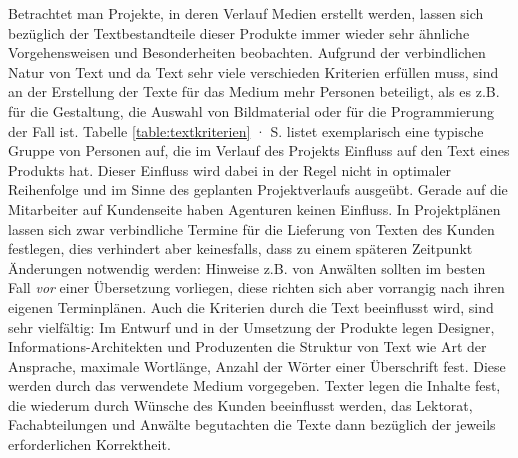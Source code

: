 Betrachtet man Projekte, in deren Verlauf Medien erstellt werden, lassen sich bezüglich der Textbestandteile dieser Produkte immer wieder sehr ähnliche Vorgehensweisen und Besonderheiten beobachten. Aufgrund der verbindlichen Natur von Text und da Text sehr viele verschieden Kriterien erfüllen muss, sind an der Erstellung der Texte für das Medium mehr Personen beteiligt, als es z.B. für die Gestaltung, die Auswahl von Bildmaterial oder für die Programmierung der Fall ist. Tabelle \ref{table:textkriterien} · S.\pageref{table:textkriterien} listet exemplarisch eine typische Gruppe von Personen auf, die im Verlauf des Projekts Einfluss auf den Text eines Produkts hat. Dieser Einfluss wird dabei in der Regel nicht in optimaler Reihenfolge und im Sinne des geplanten Projektverlaufs ausgeübt. Gerade auf die Mitarbeiter auf Kundenseite haben Agenturen keinen Einfluss. In Projektplänen lassen sich zwar verbindliche Termine für die Lieferung von Texten des Kunden festlegen, dies verhindert aber keinesfalls, dass zu einem späteren Zeitpunkt Änderungen notwendig werden: Hinweise z.B. von Anwälten sollten im besten Fall \emph{vor} einer Übersetzung vorliegen, diese richten sich aber vorrangig nach ihren eigenen Terminplänen. Auch die Kriterien durch die Text beeinflusst wird, sind sehr vielfältig: Im Entwurf und in der Umsetzung der Produkte legen Designer, Informations-Architekten und Produzenten die Struktur von Text wie Art der Ansprache, maximale Wortlänge, Anzahl der Wörter einer Überschrift fest. Diese werden durch das verwendete Medium vorgegeben. Texter legen die Inhalte fest, die wiederum durch Wünsche des Kunden beeinflusst werden, das Lektorat, Fachabteilungen und Anwälte begutachten die Texte dann bezüglich der jeweils erforderlichen Korrektheit.

